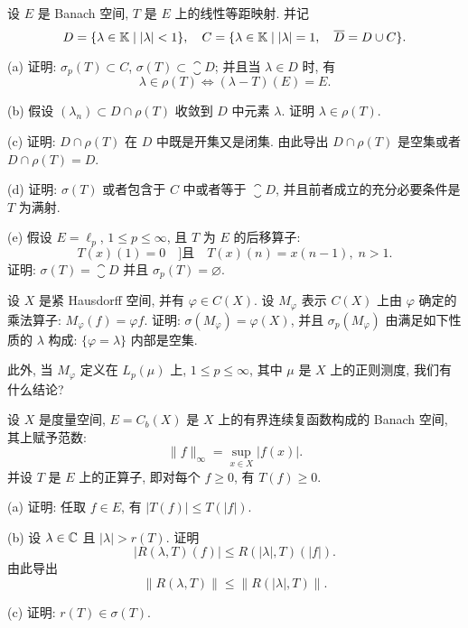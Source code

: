 \begin{exercise}
    设 $E$ 是 Banach 空间, $T$ 是 $E$ 上的线性等距映射. 并记
    \[D=\{\lambda\in\mathbb{K}\mid |\lambda|<1\},\quad C=\{\lambda\in\mathbb{K}\mid |\lambda|=1,\quad\overline{D}=D\cup C\}.\]

    (a) 证明: $\sigma_p(T)\subset C$, $\sigma(T)\subset\closure{D}$; 并且当 $\lambda\in D$ 时, 有
    \[\lambda\in\rho(T)\Leftrightarrow (\lambda-T)(E)=E.\]

    (b) 假设 $(\lambda_n)\subset D\cap\rho(T)$ 收敛到 $D$ 中元素 $\lambda$. 证明 $\lambda\in\rho(T)$.

    (c) 证明: $D\cap\rho(T)$ 在 $D$ 中既是开集又是闭集. 由此导出 $D\cap\rho(T)$ 是空集或者 $D\cap\rho(T)=D$.

    (d) 证明: $\sigma(T)$ 或者包含于 $C$ 中或者等于 $\closure{D}$, 并且前者成立的充分必要条件是 $T$ 为满射.

    (e) 假设 $E=\ell_p$, $1\leq p\leq\infty$, 且 $T$ 为 $E$ 的后移算子:
    \[T(x)(1)=0\quad]\text{且}\quad T(x)(n)=x(n-1),\; n>1.\]
    证明: $\sigma(T)=\closure{D}$ 并且 $\sigma_p(T)=\varnothing$.
\end{exercise}



\begin{exercise}
    设 $X$ 是紧 Hausdorff 空间, 并有 $\varphi\in C(X)$.
    设 $M_{\varphi}$ 表示 $C(X)$ 上由 $\varphi$ 确定的乘法算子: $M_{\varphi}(f)=\varphi f$.
    证明: $\sigma(M_{\varphi})=\varphi(X)$, 并且 $\sigma_p(M_{\varphi})$ 由满足如下性质的 $\lambda$ 构成:
    $\{\varphi=\lambda\}$ 内部是空集.

    此外, 当 $M_{\varphi}$ 定义在 $L_p(\mu)$ 上, $1\leq p\leq\infty$, 其中 $\mu$ 是 $X$ 上的正则测度,
    我们有什么结论?
\end{exercise}



\begin{exercise}
    设 $X$ 是度量空间, $E=C_b(X)$ 是 $X$ 上的有界连续复函数构成的 Banach 空间, 其上赋予范数:
    \[\|f\|_{\infty}=\sup_{x\in X}|f(x)|.\]
    并设 $T$ 是 $E$ 上的正算子, 即对每个 $f\geq 0$, 有 $T(f)\geq 0$.

    (a) 证明: 任取 $f\in E$, 有 $|T(f)|\leq T(|f|)$.

    (b) 设 $\lambda\in\mathbb{C}$ 且 $|\lambda|>r(T)$. 证明
    \[|R(\lambda,T)(f)|\leq R(|\lambda|,T)(|f|).\]
    由此导出
    \[\|R(\lambda,T)\|\leq\|R(|\lambda|,T)\|.\]

    (c) 证明: $r(T)\in\sigma(T)$.
\end{exercise}



